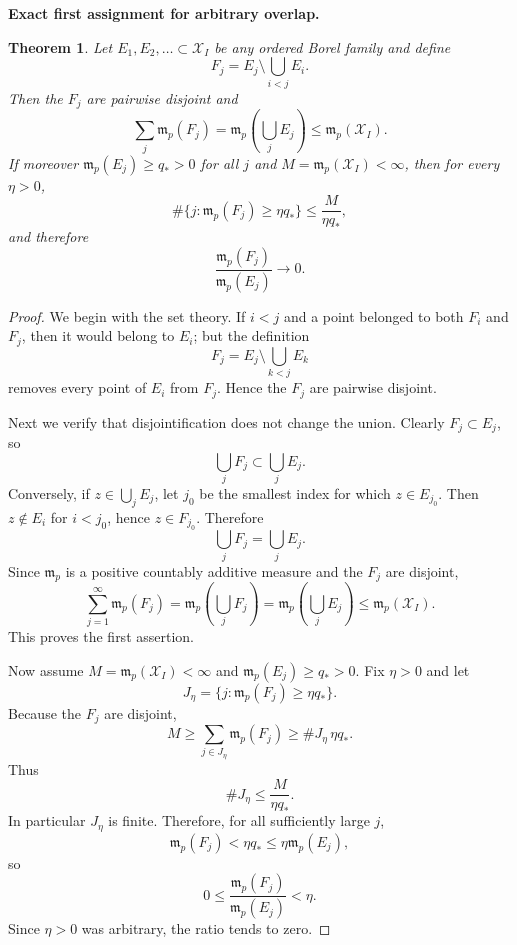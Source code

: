 \documentclass[11pt]{article}
\newtheorem{theorem}{Theorem}[section]
\theoremstyle{definition}\newtheorem{definition}[theorem]{Definition}
\theoremstyle{remark}\newtheorem{remark}[theorem]{Remark}
\begin{document}
\medskip
\noindent\textbf{Exact first assignment for arbitrary overlap.}
\begin{theorem}\label{thm:first-assigned}
Let $E_1,E_2,\dots\subset\mathcal X_I$ be any ordered Borel family and define
\[
F_j=E_j\setminus\bigcup_{i<j}E_i.
\]
Then the $F_j$ are pairwise disjoint and
\[
\boxed{
\sum_j\mathfrak m_p(F_j)
=\mathfrak m_p\!\left(\bigcup_jE_j\right)
\le\mathfrak m_p(\mathcal X_I).
}
\]
If moreover $\mathfrak m_p(E_j)\ge q_*>0$ for all $j$ and
$M=\mathfrak m_p(\mathcal X_I)<\infty$, then for every $\eta>0$,
\[
\#\{j:\mathfrak m_p(F_j)\ge\eta q_*\}
\le \frac{M}{\eta q_*},
\]
and therefore
\[
\boxed{
\frac{\mathfrak m_p(F_j)}{\mathfrak m_p(E_j)}\to0.
}
\]
\end{theorem}
\begin{proof}
We begin with the set theory.  If $i<j$ and a point belonged to both $F_i$ and
$F_j$, then it would belong to $E_i$; but the definition
\[
F_j=E_j\setminus\bigcup_{k<j}E_k
\]
removes every point of $E_i$ from $F_j$.  Hence the $F_j$ are pairwise
disjoint.

Next we verify that disjointification does not change the union.  Clearly
$F_j\subset E_j$, so
\[
\bigcup_jF_j\subset\bigcup_jE_j.
\]
Conversely, if $z\in\bigcup_jE_j$, let $j_0$ be the smallest index for which
$z\in E_{j_0}$.  Then $z\notin E_i$ for $i<j_0$, hence
$z\in F_{j_0}$.  Therefore
\[
\bigcup_jF_j=\bigcup_jE_j.
\]
Since $\mathfrak m_p$ is a positive countably additive measure and the
$F_j$ are disjoint,
\[
\sum_{j=1}^\infty\mathfrak m_p(F_j)
=\mathfrak m_p\!\left(\bigcup_jF_j\right)
=\mathfrak m_p\!\left(\bigcup_jE_j\right)
\le\mathfrak m_p(\mathcal X_I).
\]
This proves the first assertion.

Now assume $M=\mathfrak m_p(\mathcal X_I)<\infty$ and
$\mathfrak m_p(E_j)\ge q_*>0$.  Fix $\eta>0$ and let
\[
J_\eta=\{j:\mathfrak m_p(F_j)\ge\eta q_*\}.
\]
Because the $F_j$ are disjoint,
\[
M\ge\sum_{j\in J_\eta}\mathfrak m_p(F_j)
\ge\#J_\eta\,\eta q_*.
\]
Thus
\[
\#J_\eta\le\frac{M}{\eta q_*}.
\]
In particular $J_\eta$ is finite.  Therefore, for all sufficiently large
$j$,
\[
\mathfrak m_p(F_j)<\eta q_*\le\eta\mathfrak m_p(E_j),
\]
so
\[
0\le\frac{\mathfrak m_p(F_j)}{\mathfrak m_p(E_j)}<\eta.
\]
Since $\eta>0$ was arbitrary, the ratio tends to zero.
\end{proof}
\end{document}
